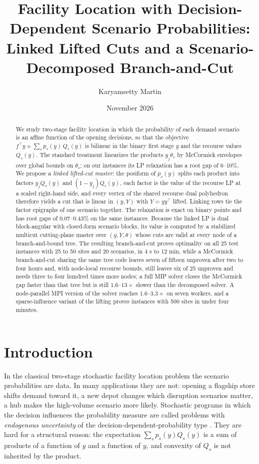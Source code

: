 \documentclass[11pt]{article}
\title{Facility Location with Decision-Dependent Scenario Probabilities:\\
Linked Lifted Cuts and a Scenario-Decomposed Branch-and-Cut}
\author{Karyamsetty Martin}
\date{November 2026}
\newcommand{\T}{^{\top}}
\begin{document}
\maketitle

\begin{abstract}
We study two-stage facility location in which the probability of each demand scenario is an affine function of the
opening decisions, so that the objective $f\T y + \sum_s p_s(y)\,Q_s(y)$ is bilinear in the binary first stage $y$ and the
recourse values $Q_s(y)$. The standard treatment linearizes the products $y_j\theta_s$ by McCormick envelopes over
global bounds on $\theta_s$; on our instances its LP relaxation has a root gap of 6--10\%. We propose a
\emph{linked lifted-cut master}: the posiform of $p_s(y)$ splits each product into factors $y_jQ_s(y)$ and
$(1-y_j)Q_s(y)$, each factor is the value of the recourse LP at a scaled right-hand side, and every vertex of the
shared recourse dual polyhedron therefore yields a cut that is linear in $(y, Y)$ with $Y = yy\T$ lifted. Linking rows
tie the factor epigraphs of one scenario together. The relaxation is exact on binary points and has root gaps of
0.07--0.43\% on the same instances. Because the linked LP is dual block-angular with closed-form scenario blocks, its
value is computed by a stabilized multicut cutting-plane master over $(y,Y,\theta)$ whose cuts are valid at every node
of a branch-and-bound tree. The resulting branch-and-cut proves optimality on all 25 test instances with 25 to 50
sites and 20 scenarios, in 4 s to 12 min, while a McCormick branch-and-cut sharing the same tree code leaves seven of
fifteen unproven after two to four hours and, with node-local recourse bounds, still leaves six of 25 unproven and
needs three to four hundred times more nodes; a full MIP solver closes the McCormick gap faster than that tree but
is still $1.6$--$13\times$ slower than the decomposed solver. A node-parallel MPI version of the
solver reaches $1.6$--$3.3\times$ on seven workers, and a sparse-influence variant of the lifting proves instances
with 500 sites in under four minutes.
\end{abstract}

\section{Introduction}

In the classical two-stage stochastic facility location problem the scenario probabilities are data. In many
applications they are not: opening a flagship store shifts demand toward it, a new depot changes which disruption
scenarios matter, a hub makes the high-volume scenario more likely. Stochastic programs in which the decision
influences the probability measure are called problems with \emph{endogenous uncertainty} of the
decision-dependent-probability type \cite{dupacova,hellemo}. They are hard for a structural reason: the expectation
$\sum_s p_s(y) Q_s(y)$ is a sum of products of a function of $y$ and a function of $y$, and convexity of $Q_s$ is
not inherited by the product.
\end{document}
